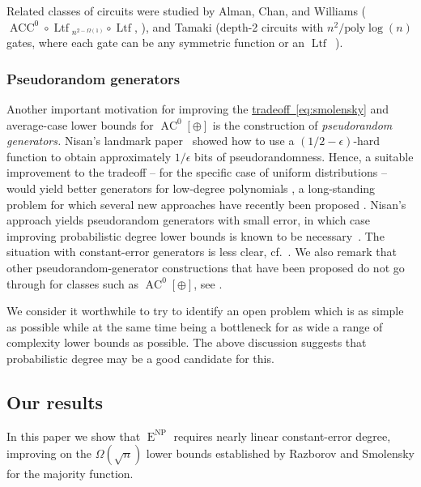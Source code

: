 \documentclass[11pt]{article}
\newcommand{\expeqref}[2]{\texorpdfstring{\hyperref[#2]{#1~\eqref{#2}}}{#1~\eqref{#2}}}
\DeclareMathOperator{\Ltf}{\mathrm{Ltf}}  %
\DeclareMathOperator{\AC}{\mathrm{AC}}  %
\DeclareMathOperator{\ACC}{\mathrm{ACC}}  %
\DeclareMathOperator{\NP}{\mathrm{NP}}  %
\DeclareMathOperator{\EEE}{\mathrm{E}}  %
\newcommand{\poly}{\mathrm{poly}}
\newcommand{\e}{\epsilon}
\begin{document}
Related classes of circuits were studied by Alman, Chan, and Williams
($\ACC^{0}\circ \Ltf{}_{n^{2-\Omega(1)}}\circ \Ltf$,
%
\cite[Corollary 1.1]{AlmanCW16}),   %
and Tamaki (depth-2 circuits with $n^{2}/\poly\log(n)$
gates, where each gate can be any symmetric function or an $\Ltf$~\cite{Tamaki16}).

\subsubsection{Pseudorandom generators}

Another important motivation for improving the \expeqref{tradeoff}{eq:smolensky}
and average-case lower bounds for $\AC^{0}[\oplus]$ is the construction
of \emph{pseudorandom generators.} Nisan's landmark paper~\cite{Nis91}
showed how to use a $(1/2-\e)$-hard function to obtain approximately
$1/\e$ bits of pseudorandomness. Hence, a suitable improvement to
the tradeoff -- for the specific case of uniform distributions --
would yield better generators for low-degree polynomials \cite{BoV-gen,Lov09,Viola-d},
a long-standing problem for which several new approaches have recently
been proposed \cite{DBLP:conf/coco/ChattopadhyayHH18,DBLP:conf/innovations/ChattopadhyayHL19,DBLP:journals/corr/abs-2008-01316,Viola-L12requiresCor}.
Nisan's approach yields pseudorandom generators with small error,
in which case improving probabilistic degree lower bounds is known
to be necessary~\cite{Viola-d}. The situation with constant-error
generators is less clear, cf.~\cite{viola-PRG-requires-MAJ}. We
also remark that other pseudorandom-generator constructions that have
been proposed do not go through for classes such as $\AC^{0}[\oplus]$,
see \cite{ShV-dec,GrinbergSV-adaptivemajority,viola-PRG-requires-MAJ}.

\medskip

We consider it worthwhile to try to identify an open problem which
is as simple as possible while at the same time being a bottleneck
for as wide a range of complexity lower bounds as possible. The above
discussion suggests that probabilistic degree may be a good candidate
for this.

\subsection{Our results}

In this %
paper  %
we show that $\EEE^{\NP}$ requires %
nearly linear %
constant-error
degree, improving on the $\Omega(\sqrt{n})$ lower bounds established
by Razborov and Smolensky \cite{Raz87,Smo87,Smolensky93} for the
majority function.
\end{document}
